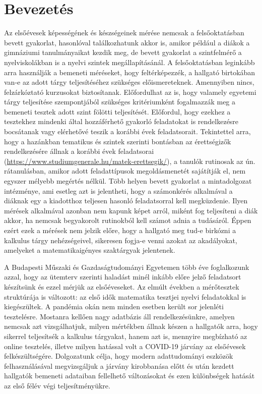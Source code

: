 \documentclass[12pt]{article}
\begin{document}
\tableofcontents
\newpage


\section{Bevezetés}
Az elsőévesek képességének és készségeinek mérése nemcsak a felsőoktatásban bevett gyakorlat, hasonlóval találkozhatunk akkor is, amikor például a diákok a gimnáziumi tanulmányaikat kezdik meg, de bevett gyakorlat a szintfelmérő a nyelviskolákban is a nyelvi szintek megállapításánál. A felsőoktatásban leginkább arra használják a bemeneti méréseket, hogy feltérképezzék, a hallgató birtokában van-e az adott tárgy teljesítéséhez szükséges előismereteknek. Amennyiben nincs, felzárkóztató kurzusokat biztosítanak. Előfordulhat az is, hogy valamely egyetemi tárgy teljesítése szempontjából szükséges kritériumként fogalmazzák meg a bemeneti tesztek adott szint fölötti teljesítését. Előfordul, hogy ezekhez a tesztekhez mindenki által hozzáférhető gyakorló feladatokat is rendelkezésre bocsátanak vagy elérhetővé teszik a korábbi évek feladatsorait. Tekintettel arra, hogy a hazánkban tematikus és szintek szerinti bontásban az érettségizők rendelkezésére állnak a korábbi évek feladatsorai (\url{https://www.studiumgenerale.hu/matek-erettsegik/}), a tanulók rutinosak az ún. rátanulásban, amikor adott feladattípusok megoldásmenetét sajátítják el, nem egyszer mélyebb megértés nélkül. Több helyen bevett gyakorlat a mintadolgozat intézménye, ami esetleg azt is jelentheti, hogy a számonkérés alkalmával a diáknak egy a kiadotthoz teljesen hasonló feladatsorral kell megküzdenie. Ilyen mérések alkalmával azonban nem kapunk képet arról, miként fog teljesíteni a diák akkor, ha nemcsak begyakorolt rutinokból kell számot adnia a tudásáról. Éppen ezért ezek a mérések nem jelzik előre, hogy a hallgató meg tud-e birkózni a kalkulus tárgy nehézségeivel, sikeresen fogja-e venni azokat az akadályokat, amelyeket a matematikaigényes szaktárgyak jelentenek.

A Budapesti Műszaki és Gazdaságtudományi Egyetemen több éve foglalkozunk azzal, hogy az ütemterv szerinti haladást minél inkább előre jelző feladatsort készítsünk és ezzel mérjük az elsőéveseket. Az elmúlt években a mérőtesztek struktúrája is változott: az első idők matematika tesztjei nyelvi feladatokkal is kiegészültek. A pandémia okán nem minden esetben került sor jelenléti tesztelésre. Mostanra kellően nagy adatbázis áll rendelkezésünkre, amelyen nemcsak azt vizsgálhatjuk, milyen mértékben állnak készen a hallgatók arra, hogy sikerrel teljesítsék a kalkulus tárgyakat, hanem azt is, mennyire megbízható az online tesztelés, illetve milyen hatással volt a COVID-19 járvány az elsőévesek felkészültségére. Dolgozatunk célja, hogy modern adattudományi eszközök felhasználásával megvizsgáljuk a járvány kirobbanása előtt és után kezdett hallgatók bemeneti adataiban fellelhető változásokat és ezen különbségek hatását az első félév végi teljesítményükre.
\end{document}
